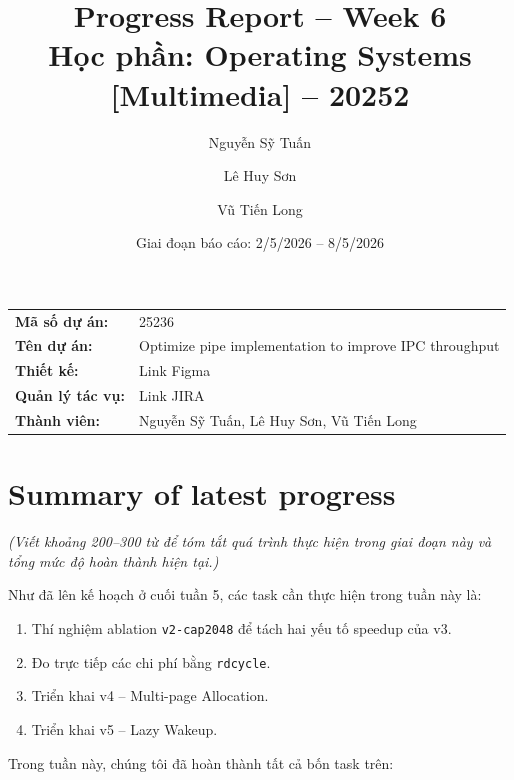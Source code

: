 \documentclass[11pt,a4paper]{article}
\title{\textbf{Progress Report -- Week 6}\\[3pt]
\large Học phần: Operating Systems [Multimedia] -- 20252}
\author{Nguyễn Sỹ Tuấn \and Lê Huy Sơn \and Vũ Tiến Long}
\date{Giai đoạn báo cáo: 2/5/2026 -- 8/5/2026}
\begin{document}
\maketitle

\begin{tabular}{@{}ll@{}}
\textbf{Mã số dự án:} & 25236 \\
\textbf{Tên dự án:}   & Optimize pipe implementation to improve IPC throughput \\
\textbf{Thiết kế:}    & Link Figma \\
\textbf{Quản lý tác vụ:} & Link JIRA \\
\textbf{Thành viên:}  & Nguyễn Sỹ Tuấn, Lê Huy Sơn, Vũ Tiến Long \\
\end{tabular}

\hrulefill

\section{Summary of latest progress}

\textit{(Viết khoảng 200--300 từ để tóm tắt quá trình thực hiện trong giai đoạn này và tổng mức độ hoàn thành hiện tại.)}

Như đã lên kế hoạch ở cuối tuần 5, các task cần thực hiện trong tuần này là:

\begin{enumerate}
  \item Thí nghiệm ablation \texttt{v2-cap2048} để tách hai yếu tố speedup của v3.
  \item Đo trực tiếp các chi phí bằng \texttt{rdcycle}.
  \item Triển khai v4 -- Multi-page Allocation.
  \item Triển khai v5 -- Lazy Wakeup.
\end{enumerate}

Trong tuần này, chúng tôi đã hoàn thành tất cả bốn task trên:
\end{document}

